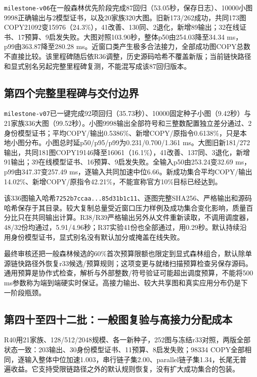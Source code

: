 \documentclass[UTF8,11pt,fontset=fandol]{ctexart}
\begin{document}
\texttt{milestone-v06}在一般森林优先阶段完成87回归（53.05秒，保存日志）、10000小图9998正确输出与2模型证书，以及20家族320大图。旧新173/262成功，共同173图COPY21092变15976（24.3\%），41改善、130同、2退化，新增89输出；32在线证书、17预算、9启发失败。大图对照103.90秒，整体p50由254.03降至34.34 ms，p99由363.87降至280.28 ms。近窗口类产生极多合法接力，全部成功图COPY总数不直接比较。该里程碑随后依R36调整，历史源码哈希不覆盖新版；当前链快路径和显式别名另起完整里程碑复测，不能混写成该87回归版本。

\subsection{第四个完整里程碑与交付边界}
\texttt{milestone-v07}已一键完成92项回归（35.73秒）、10000固定种子小图（9.42秒）与21家族336大图（99.52秒）。小图9998输出全部符号和三整数配置独立差分通过、2身份模型证书；平均COPY/输出0.5386\%、新增COPY/原指令0.6138\%，只是本地小图分布。小图总时延p50/p95/p99为0.231/0.700/1.361 ms。大图旧新181/272输出，共同181图COPY19146降至16061（16.1\%），41改善、137同、3退化，新增91输出；39在线模型证书、16预算、9启发失败。全输入p50由253.24变32.69 ms，p99由347.37变257.49 ms，逐输入共同加速中位6.66。新成功集合平均COPY/输出14.02\%、新增COPY/原指令42.21\%，不能宣称官方10\%目标已经达到。

该336图输入哈希\texttt{7252b7ccaa...85d31b1c11}、逐图完整SHA256、严格输出和源码哈希保存于其目录。较大复制总量受近窗口压力样例及成功集合变化影响，质量百分比只在共同输出计算。R38/R39严格输出另外从文件重新读取，不调用调度器，48/32份均通过，5.91/4.96秒；R37实验41份也全部通过，用0.29秒。默认持续沿用身份模型证书，显式别名没有默认加分或掩盖在线失败。

最终审核还把一般森林候选的60\%首次预算限额也限定到显式森林组合，默认除单源链快路径外恢复r33候选/预算规则；这项变更与就绪扫描预算检查另保存源码。通用预算是协作式检查，解析与外部整数/符号验证可能超出调度预算，不能将500 ms参数称为端到端硬实时保证。高接力输出、较大共享图和真实应用分布仍是下一阶段瓶颈。

\subsection{第四十至四十二批：一般图复验与高接力分配成本}
R40用21家族、128/512/2048规模、各一新种子，252图与冻结r33对照，两版全部状态一致：203输出、30身份模型证书、11预算、8启发失败；98334 COPY全部相同，逐输入整体中位加速1.003，串行链子集2.00、parallel链子集1.34，长尾无普遍收益。它支持受限链路径之外的默认规则恢复，没有扩大成功集合的包装。
\end{document}
